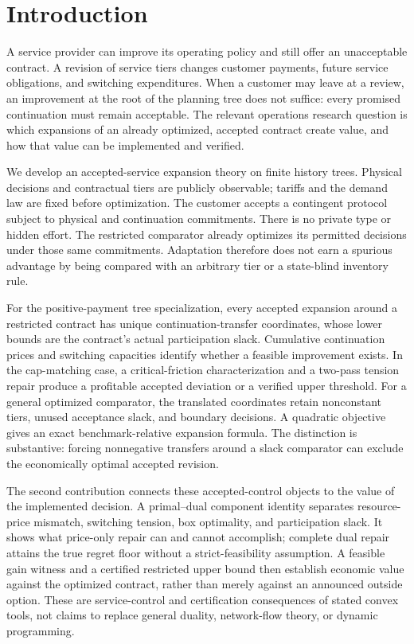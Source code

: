 \section{Introduction}
A service provider can improve its operating policy and still offer an
unacceptable contract. A revision of service tiers changes customer payments,
future service obligations, and switching expenditures. When a customer may
leave at a review, an improvement at the root of the planning tree does not
suffice: every promised continuation must remain acceptable. The relevant
operations research question is which expansions of an already optimized,
accepted contract create value, and how that value can be implemented and
verified.

We develop an accepted-service expansion theory on finite history trees.
Physical decisions and contractual tiers are publicly observable; tariffs and
the demand law are fixed before optimization. The customer accepts a contingent
protocol subject to physical and continuation commitments. There is no private
type or hidden effort. The restricted comparator already optimizes its
permitted decisions under those same commitments. Adaptation therefore does
not earn a spurious advantage by being compared with an arbitrary tier or a
state-blind inventory rule.

For the positive-payment tree specialization, every accepted expansion around a
restricted contract has unique continuation-transfer coordinates, whose lower
bounds are the contract's actual participation slack. Cumulative continuation
prices and switching capacities identify whether a feasible improvement exists.
In the cap-matching case, a critical-friction characterization and a two-pass
tension repair produce a profitable accepted deviation or a verified upper
threshold. For a general optimized comparator, the translated coordinates retain
nonconstant tiers, unused acceptance slack, and boundary decisions. A quadratic
objective gives an exact benchmark-relative expansion formula. The distinction
is substantive: forcing nonnegative transfers around a slack comparator can
exclude the economically optimal accepted revision.

The second contribution connects these accepted-control objects to the value
of the implemented decision. A primal--dual component identity separates
resource-price mismatch, switching tension, box optimality, and participation
slack. It shows what price-only repair can and cannot accomplish; complete dual
repair attains the true regret floor without a strict-feasibility assumption.
A feasible gain witness and a certified restricted upper bound then establish
economic value against the optimized contract, rather than merely against an
announced outside option. These are service-control and certification
consequences of stated convex tools, not claims to replace general duality,
network-flow theory, or dynamic programming.

